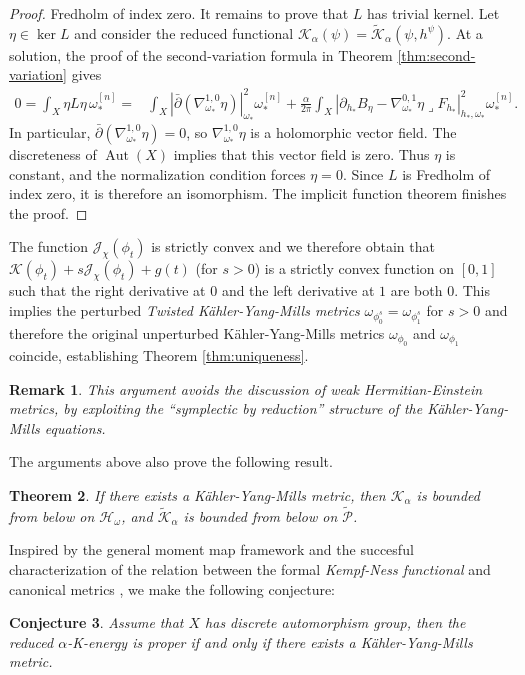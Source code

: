 \documentclass[10pt, letterpaper]{amsart}
\theoremstyle{plain}
\newtheorem{theorem}{Theorem}[section]
\newtheorem{remark}[theorem]{Remark}
\newtheorem{conjecture}[theorem]{Conjecture}
\theoremstyle{definition}
\numberwithin{equation}{section}
\begin{document}
\begin{proof}
Fredholm of index zero. It remains to prove that $L$ has trivial kernel.  Let $\eta\in\ker L$ and
consider the reduced functional
$\mathcal K_\alpha(\psi)=\widetilde{\mathcal K}_\alpha(\psi,h^\psi)$.
At a solution, the proof of the second-variation formula in Theorem
\ref{thm:second-variation} gives
\begin{align}
0
=\int_X\eta L\eta\,\omega_*^{[n]}
=&\int_X\left|\bar\partial\left(
\nabla_{\omega_*}^{1,0}\eta\right)\right|_{\omega_*}^2
\omega_*^{[n]}
+\frac{\alpha}{2\pi}
\int_X\left|
\partial_{h_*}B_\eta
-\nabla_{\omega_*}^{0,1}\eta\mathbin{\lrcorner}F_{h_*}
\right|_{h_*,\omega_*}^2\omega_*^{[n]}.
\label{eq:reduced-linearization-kernel}
\end{align}
In particular,
$\bar\partial\left(\nabla_{\omega_*}^{1,0}\eta\right)=0$, so
$\nabla_{\omega_*}^{1,0}\eta$ is a holomorphic vector field.  The
discreteness of $\operatorname{Aut}(X)$ implies that this vector field is
zero.  Thus $\eta$ is constant, and the normalization condition forces $\eta=0$.
Since $L$ is Fredholm of index zero, it is therefore an isomorphism. The implicit function theorem finishes the proof.

\end{proof}
The function $\mathcal{J}_\chi(\phi_t)$ is strictly convex and we therefore obtain that $\mathcal{K}\left(\phi_t\right)+s\mathcal{J}_\chi(\phi_t)+g(t)$ (for $s>0$) is a strictly convex function on $[0,1]$ such that the right derivative at $0$ and the left derivative at $1$ are both $0$. This implies the perturbed \emph{Twisted K\"ahler-Yang-Mills metrics} $\omega_{\phi_0^s}=\omega_{\phi_1^s}$ for $s>0$ and therefore the original unperturbed K\"ahler-Yang-Mills metrics $\omega_{\phi_0}$ and $\omega_{\phi_1}$ coincide, establishing Theorem \ref{thm:uniqueness}.

\begin{remark}
	This argument avoids the discussion of weak Hermitian-Einstein metrics, by exploiting the ``symplectic by reduction'' structure of the K\"ahler-Yang-Mills equations. 
\end{remark}
The arguments above also prove the following result.
\begin{theorem}
	If there exists a K\"ahler-Yang-Mills metric, then $\mathcal{K}_\alpha$ is bounded from below on $\mathcal{H}_\omega$, and $\widetilde{\mathcal{K}}_\alpha$ is bounded from below on $\widetilde{\mathcal{P}}$. 
\end{theorem}

Inspired by the general moment map framework and the succesful characterization of the relation between the formal \emph{Kempf-Ness functional} and canonical metrics \cite{Tian, donald, HJ, CC}, we make the following conjecture:
\begin{conjecture}
	Assume that $X$ has discrete automorphism group, then the reduced $\alpha$-K-energy is proper if and only if there exists a K\"ahler-Yang-Mills metric. 
\end{conjecture}
\end{document}
